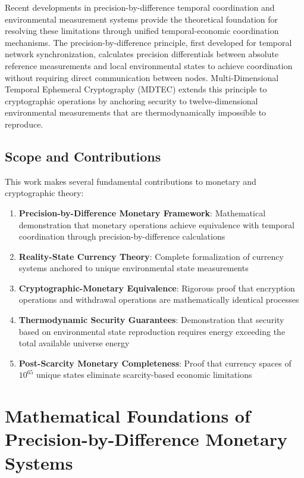 \documentclass[12pt,a4paper]{article}
\begin{document}
Recent developments in precision-by-difference temporal coordination and environmental measurement systems provide the theoretical foundation for resolving these limitations through unified temporal-economic coordination mechanisms. The precision-by-difference principle, first developed for temporal network synchronization, calculates precision differentials between absolute reference measurements and local environmental states to achieve coordination without requiring direct communication between nodes. Multi-Dimensional Temporal Ephemeral Cryptography (MDTEC) extends this principle to cryptographic operations by anchoring security to twelve-dimensional environmental measurements that are thermodynamically impossible to reproduce.

\subsection{Scope and Contributions}

This work makes several fundamental contributions to monetary and cryptographic theory:

\begin{enumerate}
\item \textbf{Precision-by-Difference Monetary Framework}: Mathematical demonstration that monetary operations achieve equivalence with temporal coordination through precision-by-difference calculations
\item \textbf{Reality-State Currency Theory}: Complete formalization of currency systems anchored to unique environmental state measurements
\item \textbf{Cryptographic-Monetary Equivalence}: Rigorous proof that encryption operations and withdrawal operations are mathematically identical processes
\item \textbf{Thermodynamic Security Guarantees}: Demonstration that security based on environmental state reproduction requires energy exceeding the total available universe energy
\item \textbf{Post-Scarcity Monetary Completeness}: Proof that currency spaces of $10^{65}$ unique states eliminate scarcity-based economic limitations
\end{enumerate}

\section{Mathematical Foundations of Precision-by-Difference Monetary Systems}
\end{document}
